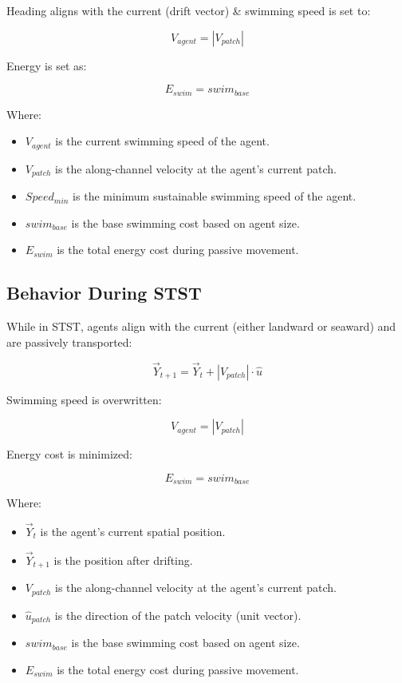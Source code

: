 \documentclass[
]{book}
\begin{document}
Heading aligns with the current (drift vector) \& swimming speed is set to:

\[
V_{agent} = |V_{patch}|
\]

Energy is set as:

\[
E_{swim} = swim_{base}
\]

Where:

\begin{itemize}
\item
  \(V_{agent}\) is the current swimming speed of the agent.
\item
  \(V_{patch}\) is the along-channel velocity at the agent's current patch.
\item
  \(Speed_{min}\) is the minimum sustainable swimming speed of the agent.
\item
  \(swim_{base}\) is the base swimming cost based on agent size.
\item
  \(E_{swim}\) is the total energy cost during passive movement.
\end{itemize}

\subsection{Behavior During STST}\label{behavior-during-stst}

While in STST, agents align with the current (either landward or seaward) and are passively transported:

\[
\vec{Y}_{t+1} = \vec{Y}_t + |V_{patch}| \cdot \hat{u}
\]

Swimming speed is overwritten:

\[
V_{agent} = |V_{patch}|
\]

Energy cost is minimized:

\[
E_{swim} = swim_{base}
\]

Where:

\begin{itemize}
\item
  \(\vec{Y}_t\) is the agent's current spatial position.
\item
  \(\vec{Y}_{t+1}\) is the position after drifting.
\item
  \(V_{patch}\) is the along-channel velocity at the agent's current patch.
\item
  \(\hat{u}_{patch}\) is the direction of the patch velocity (unit vector).
\item
  \(swim_{base}\) is the base swimming cost based on agent size.
\item
  \(E_{swim}\) is the total energy cost during passive movement.
\end{itemize}
\end{document}
